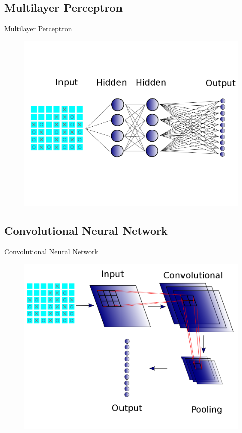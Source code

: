 \subsection{Multilayer Perceptron}

\begin{frame}{Multilayer Perceptron}
\begin{figure}
\includegraphics[width=0.8 \textwidth]{"mlp all lines"}
\end{figure}
\end{frame}

\subsection{Convolutional Neural Network}

\begin{frame}{Convolutional Neural Network}
\begin{figure}
\includegraphics[width=0.8 \textwidth]{"CNN"}
\end{figure}
\end{frame}

